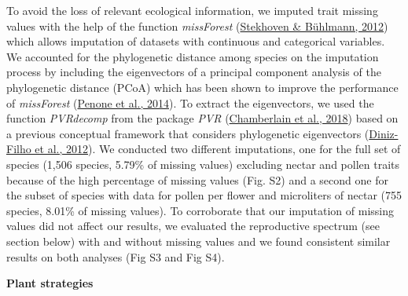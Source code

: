 \documentclass[
  12pt,
  a4paper,
]{article}
\begin{document}
To avoid the loss of relevant ecological information, we imputed trait missing values with the help of the function \emph{missForest} (\protect\hyperlink{ref-stekhoven2012}{Stekhoven \& Bühlmann, 2012}) which allows imputation of datasets with continuous and categorical variables. We accounted for the phylogenetic distance among species on the imputation process by including the eigenvectors of a principal component analysis of the phylogenetic distance (PCoA) which has been shown to improve the performance of \emph{missForest} (\protect\hyperlink{ref-penone2014}{Penone et al., 2014}). To extract the eigenvectors, we used the function \emph{PVRdecomp} from the package \emph{PVR} (\protect\hyperlink{ref-santos2018}{Chamberlain et al., 2018}) based on a previous conceptual framework that considers phylogenetic eigenvectors (\protect\hyperlink{ref-diniz-filho2012}{Diniz-Filho et al., 2012}). We conducted two different imputations, one for the full set of species (1,506 species, 5.79\% of missing values) excluding nectar and pollen traits because of the high percentage of missing values (Fig. S2) and a second one for the subset of species with data for pollen per flower and microliters of nectar (755 species, 8.01\% of missing values). To corroborate that our imputation of missing values did not affect our results, we evaluated the reproductive spectrum (see section below) with and without missing values and we found consistent similar results on both analyses (Fig S3 and Fig S4).

\textbf{Plant strategies}
\end{document}

